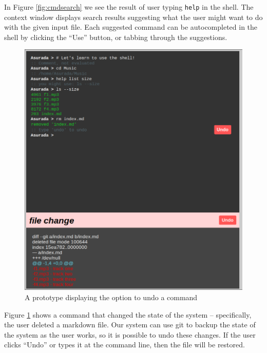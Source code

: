 In Figure \ref{fig:cmdsearch} we see the result of user typing \texttt{help} in
the shell. The context window displays search results suggesting what the user
might want to do with the given input file. Each suggested command can be
autocompleted in the shell by clicking the ``Use'' button, or tabbing through
the suggestions.

\begin{figure}[H]
  \centering
  \includegraphics[width=0.85\linewidth]{figures/prototype/undo.jpg}
  \caption{A prototype displaying the option to undo a command}
  \label{fig:cmdundo}
\end{figure}

Figure \ref{fig:cmdundo} shows a command that changed the state of the system
\--- specifically, the user deleted a markdown file. Our system can use git to
backup the state of the system as the user works, so it is possible to undo
these changes. If the user clicks ``Undo'' or types it at the command line, then the file will be restored.
